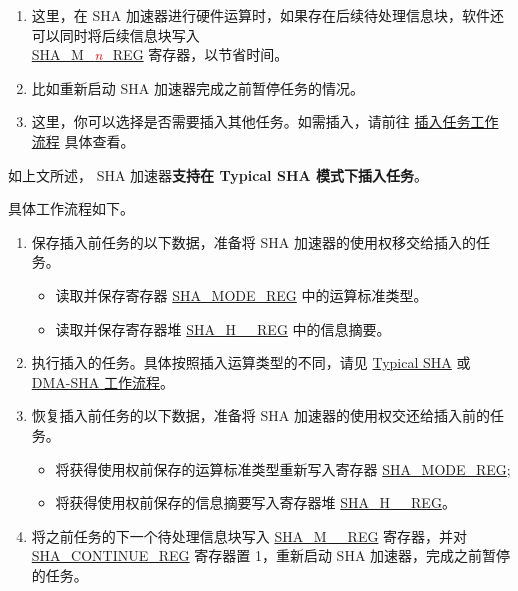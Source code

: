 \documentclass[main\_\_CN.tex]{subfiles}
\begin{document}
\begin{tiplisting}\label{others:sha-note-typical-sha}
\vspace{-2.5em}
\begin{enumerate}
\item 这里，在 SHA 加速器进行硬件运算时，如果存在后续待处理信息块，软件还可以同时将后续信息块写入 \\ \hyperref[regdesc:SHAMNREG]{SHA\_M\_\textcolor{red}{\it{n}}\_REG} 寄存器，以节省时间。
\item 比如重新启动 SHA 加速器完成之前暂停任务的情况。
\item 这里，你可以选择是否需要插入其他任务。如需插入，请前往 \hyperref[others:sha-interleaved]{插入任务工作流程} 具体查看。
\end{enumerate}
\end{tiplisting}

\label{others:sha-interleaved}如上文所述，\chipname{} SHA 加速器\textbf{支持在 Typical SHA 模式下插入任务}。

具体工作流程如下。

\begin{enumerate}
    \item 保存插入前任务的以下数据，准备将 SHA 加速器的使用权移交给插入的任务。
        \begin{itemize}
            \item 读取并保存寄存器 \hyperref[regdesc:SHAMODEREG]{SHA\_MODE\_REG} 中的运算标准类型。
            \item 读取并保存寄存器堆 \hyperref[regdesc:SHAHNREG]{SHA\_H\_\_REG} 中的信息摘要。
        \end{itemize}
    \item 执行插入的任务。具体按照插入运算类型的不同，请见 \hyperref[sec:sha-typical-sha]{Typical SHA} 或 \hyperref[sec:sha-dma-sha]{DMA-SHA 工作流程}。
    \item 恢复插入前任务的以下数据，准备将 SHA 加速器的使用权交还给插入前的任务。
        \begin{itemize}
            \item 将获得使用权前保存的运算标准类型重新写入寄存器 \hyperref[regdesc:SHAMODEREG]{SHA\_MODE\_REG};
            \item 将获得使用权前保存的信息摘要写入寄存器堆 \hyperref[regdesc:SHAHNREG]{SHA\_H\_\_REG}。
        \end{itemize}
    \item 将之前任务的下一个待处理信息块写入 \hyperref[regdesc:SHAMNREG]{SHA\_M\_\_REG} 寄存器，并对 \hyperref[regdesc:SHACONTINUEREG]{SHA\_CONTINUE\_REG} 寄存器置 1，重新启动 SHA 加速器，完成之前暂停的任务。
\end{enumerate}
\end{document}

